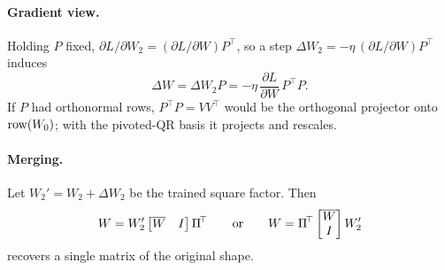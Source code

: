 \paragraph{Gradient view.}
Holding $P$ fixed, $\partial L/\partial W_2=(\partial L/\partial W)P^{\!\top}$,
so a step $\Delta W_2=-\eta\,(\partial L/\partial W)P^{\!\top}$ induces
\begin{equation}
  \Delta W=\Delta W_2P=-\eta\,\frac{\partial L}{\partial W}\,P^{\!\top}\!P .
  \label{eq:m-precond}
\end{equation}
If $P$ had orthonormal rows, $P^{\!\top}\!P=VV^{\!\top}$ would be the orthogonal
projector onto $\operatorname{row}(W_0)$; with the pivoted-QR basis it projects and
rescales.

\paragraph{Merging.}
Let $W_2'=W_2+\Delta W_2$ be the trained square factor. Then
\begin{equation}
  W=W_2'\begin{bmatrix}\overline{W} & I\end{bmatrix}\Pi^{\!\top}
  \qquad\text{or}\qquad
  W=\Pi^{\!\top}\begin{bmatrix}\overline{W}\\ I\end{bmatrix}W_2'
  \label{eq:m-merge}
\end{equation}
recovers a single matrix of the original shape.


